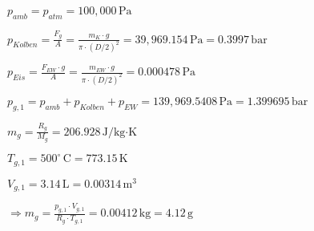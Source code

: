 \( p_{amb} = p_{atm} = 100,000 \, \text{Pa} \)  

\( p_{Kolben} = \frac{F_g}{A} = \frac{m_K \cdot g}{\pi \cdot (D/2)^2} = 39,969.154 \, \text{Pa} = 0.3997 \, \text{bar} \)  

\( p_{Eis} = \frac{F_{EW} \cdot g}{A} = \frac{m_{EW} \cdot g}{\pi \cdot (D/2)^2} = 0.000478 \, \text{Pa} \)  

\( p_{g,1} = p_{amb} + p_{Kolben} + p_{EW} = 139,969.5408 \, \text{Pa} = 1.399695 \, \text{bar} \)  

\( m_g = \frac{R_g}{M_g} = 206.928 \, \text{J/kg·K} \)  

\( T_{g,1} = 500^\circ \, \text{C} = 773.15 \, \text{K} \)  

\( V_{g,1} = 3.14 \, \text{L} = 0.00314 \, \text{m}^3 \)  

\( \Rightarrow m_g = \frac{p_{g,1} \cdot V_{g,1}}{R_g \cdot T_{g,1}} = 0.00412 \, \text{kg} = 4.12 \, \text{g} \)